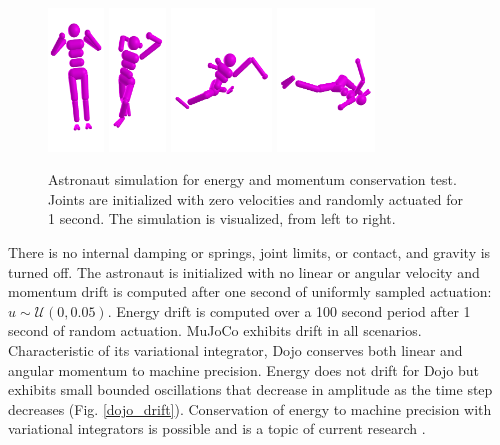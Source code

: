\begin{figure}[H]
	\centering
	\includegraphics[height=3.8cm]{dojo/astronaut1.png} 
	\includegraphics[height=3.8cm]{dojo/astronaut2.png}
	\includegraphics[height=3.8cm]{dojo/astronaut3.png}
	\includegraphics[height=3.8cm]{dojo/astronaut4.png}
	\caption[Astronaut energy and momentum drift simulation]{Astronaut simulation for energy and momentum conservation test. Joints are initialized with zero velocities and randomly actuated for 1 second. The simulation is visualized, from left to right.}
	\label{dojo_astronaut}
\end{figure}

There is no internal damping or springs, joint limits, or contact, and gravity is turned off. The astronaut is initialized with no linear or angular velocity and momentum drift is computed after one second of uniformly sampled actuation: $u \sim \mathcal{U}(0,0.05)$. Energy drift is computed over a 100 second period after 1 second of random actuation. MuJoCo exhibits drift in all scenarios. Characteristic of its variational integrator, Dojo conserves both linear and angular momentum to machine precision. Energy does not drift for Dojo but exhibits small bounded oscillations that decrease in amplitude as the time step decreases (Fig. \ref{dojo_drift}). Conservation of energy to machine precision with variational integrators is possible and is a topic of current research \cite{sharma2018energy}.


